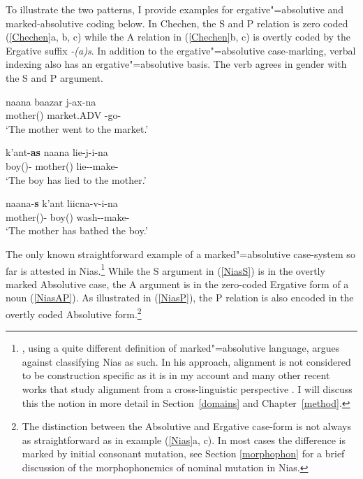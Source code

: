 To illustrate the two patterns, I provide examples for ergative"=absolutive and marked-absolutive coding below.
In Chechen, the S and P relation is zero coded (\ref{Chechen}a, b, c) while the A relation in (\ref{Chechen}b, c) is overtly coded by the Ergative suffix \emph{-(a)s}.
In addition to the ergative"=absolutive case-marking, verbal indexing also has an ergative"=absolutive basis. 
The verb agrees in gender with the S and P argument. 

\begin{exe}\ex\label{Chechen}
\begin{xlist}\ex\label{ChechenS}\gll naana baazar j-ax-na\\
mother(\fem{}) market.ADV \fem{}-go-\prf{}\\
\glt `The mother went to the market.'

\ex\gll k'ant-\textbf{as} naana lie-j-i-na\\
boy(\mas{})-{\erg{}} mother(\fem{}) lie-\fem{}-make-\prf{}\\
\glt `The boy has lied to the mother.'

\ex\gll naana-\textbf{s} k'ant liicna-v-i-na\\
mother(\fem{})-{\erg{}} boy(\mas{}) wash-\mas{}-make-\prf{}\\
\glt `The mother has bathed the boy.'
\end{xlist}
  \end{exe}

The only known straightforward example of a marked"=absolutive case-system so far is attested in Nias.\footnote{\citet{Crysmann:2009}, using a quite different definition of marked"=absolutive language, argues against classifying Nias as such. 
In his approach, alignment is not considered to be construction specific as it is in my account and many other recent works that study alignment from a cross-linguistic perspective \citep[cf. among others][]{Bickel.align}. 
I will discuss this the notion in more detail in Section~\ref{domains} and Chapter~\ref{method}.} 
While the S argument in (\ref{NiasS}) is in the overtly marked Absolutive case, the A argument is in the zero-coded Ergative form of a noun (\ref{NiasAP}). 
As illustrated in (\ref{NiasP}), the P relation is also encoded in the overtly coded Absolutive form.\footnote{The distinction between the Absolutive and Ergative case-form is not always as straightforward as in example (\ref{Nias}a, c). 
In most cases the difference is marked by initial consonant mutation, see Section \ref{morphophon} for a brief discussion of the morphophonemics of nominal mutation in Nias.}
  
